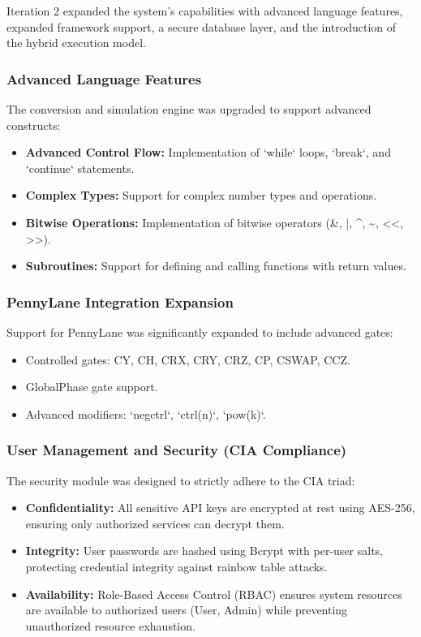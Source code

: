 Iteration 2 expanded the system's capabilities with advanced language features, expanded framework support, a secure database layer, and the introduction of the hybrid execution model.



\subsubsection{Advanced Language Features}
The conversion and simulation engine was upgraded to support advanced constructs:
\begin{itemize}
    \item \textbf{Advanced Control Flow:} Implementation of `while` loops, `break`, and `continue` statements.
    \item \textbf{Complex Types:} Support for complex number types and operations.
    \item \textbf{Bitwise Operations:} Implementation of bitwise operators (\&, |, \textasciicircum, \textasciitilde, <<, >>).
    \item \textbf{Subroutines:} Support for defining and calling functions with return values.
\end{itemize}

\subsubsection{PennyLane Integration Expansion}
Support for PennyLane was significantly expanded to include advanced gates:
\begin{itemize}
    \item Controlled gates: CY, CH, CRX, CRY, CRZ, CP, CSWAP, CCZ.
    \item GlobalPhase gate support.
    \item Advanced modifiers: `negctrl`, `ctrl(n)`, `pow(k)`.
\end{itemize}

\subsubsection{User Management and Security (CIA Compliance)}
The security module was designed to strictly adhere to the CIA triad:
\begin{itemize}
    \item \textbf{Confidentiality:} All sensitive API keys are encrypted at rest using AES-256, ensuring only authorized services can decrypt them.
    \item \textbf{Integrity:} User passwords are hashed using Bcrypt with per-user salts, protecting credential integrity against rainbow table attacks.
    \item \textbf{Availability:} Role-Based Access Control (RBAC) ensures system resources are available to authorized users (User, Admin) while preventing unauthorized resource exhaustion.
\end{itemize}

